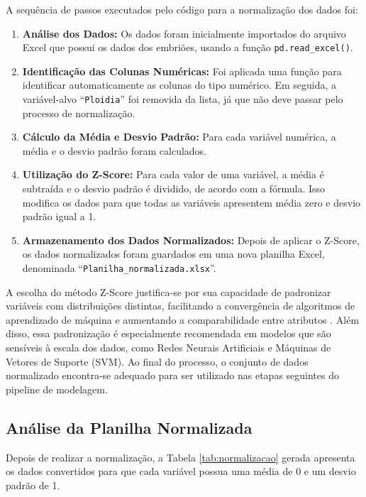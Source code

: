 A sequência de passos executados pelo código para a normalização dos dados foi:

\begin{enumerate}
    \item \textbf{Análise dos Dados:} Os dados foram inicialmente importados do arquivo Excel que possui os dados dos embriões, usando a função \texttt{pd.read\_excel()}.
    
    \item \textbf{Identificação das Colunas Numéricas:} Foi aplicada uma função para identificar automaticamente as colunas do tipo numérico. Em seguida, a variável-alvo “\texttt{Ploidia}” foi removida da lista, já que não deve passar pelo processo de normalização.
    
    \item \textbf{Cálculo da Média e Desvio Padrão:} Para cada variável numérica, a média e o desvio padrão foram calculados.
    
    \item \textbf{Utilização do Z-Score:} Para cada valor de uma variável, a média é subtraída e o desvio padrão é dividido, de acordo com a fórmula. Isso modifica os dados para que todas as variáveis apresentem média zero e desvio padrão igual a 1.
    
    \item \textbf{Armazenamento dos Dados Normalizados:} Depois de aplicar o Z-Score, os dados normalizados foram guardados em uma nova planilha Excel, denominada “\texttt{Planilha\_normalizada.xlsx}”.
\end{enumerate}

A escolha do método Z-Score justifica-se por sua capacidade de padronizar variáveis com distribuições distintas, facilitando a convergência de algoritmos de aprendizado de máquina e aumentando a comparabilidade entre atributos \cite{jaiswal2024}. Além disso, essa padronização é especialmente recomendada em modelos que são sensíveis à escala dos dados, como Redes Neurais Artificiais e Máquinas de Vetores de Suporte (SVM). Ao final do processo, o conjunto de dados normalizado encontra-se adequado para ser utilizado nas etapas seguintes do pipeline de modelagem.

\subsection*{Análise da Planilha Normalizada}
Depois de realizar a normalização, a Tabela \ref{tab:normalizacao} gerada apresenta os dados convertidos para que cada variável possua uma média de 0 e um desvio padrão de 1. 

